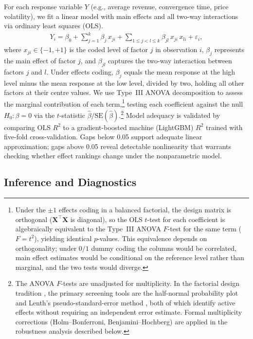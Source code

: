 For each response variable $Y$ (e.g., average revenue, convergence time, price volatility), we fit a linear model with main effects and all two-way interactions via ordinary least squares (OLS).
\begin{align}
  Y_i = \beta_0 + \sum_{j=1}^{k} \beta_j\, x_{ji} + \sum_{1 \le j < l \le k} \beta_{jl}\, x_{ji}\, x_{li} + \varepsilon_i,
  \label{eq:ols}
\end{align}
where $x_{ji} \in \{-1, +1\}$ is the coded level of factor $j$ in observation $i$, $\beta_j$ represents the main effect of factor $j$, and $\beta_{jl}$ captures the two-way interaction between factors $j$ and $l$. Under effects coding, $\beta_j$ equals the mean response at the high level minus the mean response at the low level, divided by two, holding all other factors at their centre values. We use Type~III ANOVA decomposition to assess the marginal contribution of each term,\footnote{Under the $\pm 1$ effects coding in a balanced factorial, the design matrix is orthogonal ($\mathbf{X}^\top\mathbf{X}$ is diagonal), so the OLS $t$-test for each coefficient is algebraically equivalent to the Type~III ANOVA $F$-test for the same term ($F = t^2$), yielding identical $p$-values. This equivalence depends on orthogonality; under $0/1$ dummy coding the columns would be correlated, main effect estimates would be conditional on the reference level rather than marginal, and the two tests would diverge.} testing each coefficient against the null $H_0\!: \beta = 0$ via the $t$-statistic $\hat{\beta}/\text{SE}(\hat{\beta})$.\footnote{The ANOVA $F$-tests are unadjusted for multiplicity. In the factorial design tradition \citep{Box2005}, the primary screening tools are the half-normal probability plot and Lenth's pseudo-standard-error method \citep{Lenth1989}, both of which identify active effects without requiring an independent error estimate. Formal multiplicity corrections (Holm--Bonferroni, Benjamini--Hochberg) are applied in the robustness analysis described below.} Model adequacy is validated by comparing OLS $R^2$ to a gradient-boosted machine (LightGBM) $R^2$ trained with five-fold cross-validation. Gaps below 0.05 support adequate linear approximation; gaps above 0.05 reveal detectable nonlinearity that warrants checking whether effect rankings change under the nonparametric model.

\subsection{Inference and Diagnostics}

